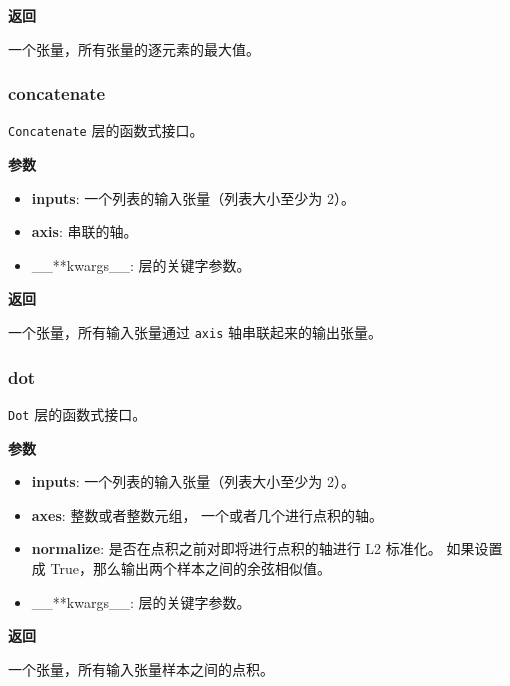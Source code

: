 \textbf{返回}

一个张量，所有张量的逐元素的最大值。



\subsubsection{concatenate}\label{concatenate}

\begin{Shaded}
\begin{Highlighting}[]
\OperatorTok{=-}\NormalTok{)}
\end{Highlighting}
\end{Shaded}

\texttt{Concatenate} 层的函数式接口。

\textbf{参数}

\begin{itemize}
\tightlist
\item
  \textbf{inputs}: 一个列表的输入张量（列表大小至少为 2）。
\item
  \textbf{axis}: 串联的轴。
\item
  \_\_**kwargs\_\_: 层的关键字参数。
\end{itemize}

\textbf{返回}

一个张量，所有输入张量通过 \texttt{axis} 轴串联起来的输出张量。



\subsubsection{dot}\label{dot}

\begin{Shaded}
\begin{Highlighting}[]
\OperatorTok{=}\NormalTok{)}
\end{Highlighting}
\end{Shaded}

\texttt{Dot} 层的函数式接口。

\textbf{参数}

\begin{itemize}
\tightlist
\item
  \textbf{inputs}: 一个列表的输入张量（列表大小至少为 2）。
\item
  \textbf{axes}: 整数或者整数元组， 一个或者几个进行点积的轴。
\item
  \textbf{normalize}: 是否在点积之前对即将进行点积的轴进行 L2 标准化。
  如果设置成 True，那么输出两个样本之间的余弦相似值。
\item
  \_\_**kwargs\_\_: 层的关键字参数。
\end{itemize}

\textbf{返回}

一个张量，所有输入张量样本之间的点积。

\newpage

